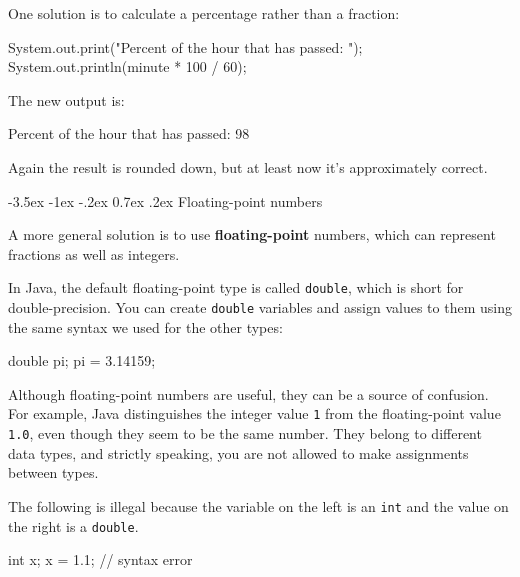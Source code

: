 \documentclass[12pt]{book}
\makeatletter
\theoremstyle{exercise}
\newcommand{\java}[1]{\verb"#1"}
\renewcommand{\section}{\@startsection {section}{1}{\z@}%
    {-3.5ex \@plus -1ex \@minus -.2ex}%
    {0.7ex \@plus.2ex}%
    {\normalfont\Large\bfseries}}
\newcommand{\java}[1]{\lstinline{#1}} %
\makeatother
\begin{document}
One solution is to calculate a percentage rather than a fraction:

\begin{code}
    System.out.print("Percent of the hour that has passed: ");
    System.out.println(minute * 100 / 60);
\end{code}

The new output is:

\begin{stdout}
Percent of the hour that has passed: 98
\end{stdout}

Again the result is rounded down, but at least now it's approximately correct.


\section{Floating-point numbers}


A more general solution is to use {\bf floating-point} numbers, which can represent fractions as well as integers.

In Java, the default floating-point type is called \java{double}, which is short for double-precision.
You can create \java{double} variables and assign values to them using the same syntax we used for the other types:

\begin{code}
    double pi;
    pi = 3.14159;
\end{code}

Although floating-point numbers are useful, they can be a source of confusion.
For example, Java distinguishes the integer value \java{1} from the floating-point value \java{1.0}, even though they seem to be the same number.
They belong to different data types, and strictly speaking, you are not allowed to make assignments between types.

The following is illegal because the variable on the left is an \java{int} and the value on the right is a \java{double}.

\begin{code}
    int x;
    x = 1.1;  // syntax error
\end{code}
\end{document}

